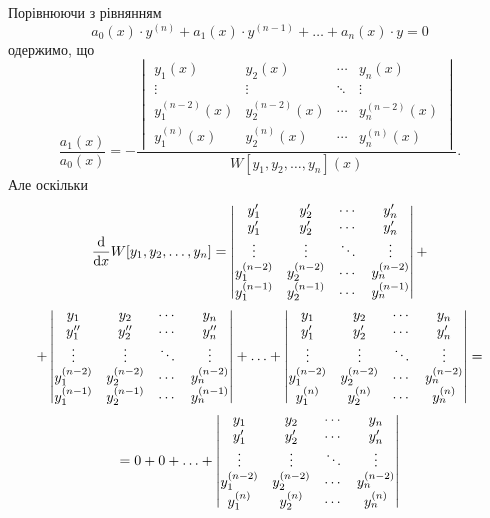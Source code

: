 Порівнюючи з рівнянням 
\begin{equation*}
	a_0(x) \cdot y^{(n)} + a_1(x) \cdot y^{(n - 1)} + \ldots + a_n(x) \cdot y = 0
\end{equation*}
одержимо, що
\begin{equation*}
	\frac{a_1(x)}{a_0(x)} = - \frac{\begin{vmatrix}
		y_1(x) & y_2(x) & \cdots & y_n(x) \\
		\vdots & \vdots & \ddots & \vdots \\
		y_1^{(n - 2)}(x) & y_2^{(n - 2)}(x) & \cdots & y_n^{(n - 2)}(x) \\
		y_1^{(n)}(x) & y_2^{(n)}(x) & \cdots & y_n^{(n)}(x)
	\end{vmatrix}}{W[y_1, y_2, \ldots, y_n](x)}.
\end{equation*}
Але оскільки
\begin{multline}
	\frac{\mathop{}\!\mathrm{d}}{\mathop{}\!\mathrm{d} x} W[y_1, y_2, \ldots, y_n] = \begin{vmatrix}
		y_1' & y_2' & \cdots & y_n' \\
		y_1' & y_2' & \cdots & y_n' \\
		\vdots & \vdots & \ddots & \vdots \\
		y_1^{(n - 2)} & y_2^{(n - 2)} & \cdots & y_n^{(n - 2)} \\
		y_1^{(n - 1)} & y_2^{(n - 1)} & \cdots & y_n^{(n - 1)}
	\end{vmatrix} + \\ + \begin{vmatrix}
		y_1 & y_2 & \cdots & y_n \\
		y_1'' & y_2'' & \cdots & y_n'' \\
		\vdots & \vdots & \ddots & \vdots \\
		y_1^{(n - 2)} & y_2^{(n - 2)} & \cdots & y_n^{(n - 2)} \\
		y_1^{(n - 1)} & y_2^{(n - 1)} & \cdots & y_n^{(n - 1)}
	\end{vmatrix} + \ldots + \begin{vmatrix}
		y_1 & y_2 & \cdots & y_n \\
		y_1' & y_2' & \cdots & y_n' \\
		\vdots & \vdots & \ddots & \vdots \\
		y_1^{(n - 2)} & y_2^{(n - 2)} & \cdots & y_n^{(n - 2)} \\
		y_1^{(n)} & y_2^{(n)} & \cdots & y_n^{(n)}
	\end{vmatrix} = \\ = 0 + 0 + \ldots + \begin{vmatrix}
		y_1 & y_2 & \cdots & y_n \\
		y_1' & y_2' & \cdots & y_n' \\
		\vdots & \vdots & \ddots & \vdots \\
		y_1^{(n - 2)} & y_2^{(n - 2)} & \cdots & y_n^{(n - 2)}\\
		y_1^{(n)} & y_2^{(n)} & \cdots & y_n^{(n)}
	\end{vmatrix}
\end{multline}   
